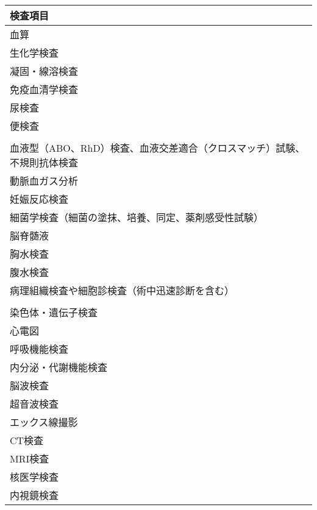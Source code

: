 \begin{xltabular}{\linewidth}{X}
\caption{\label{tbl:labo}} \\
\toprule
検査項目 \\
\midrule
\endhead
血算 \\
生化学検査 \\
凝固・線溶検査 \\
免疫血清学検査 \\
尿検査 \\
便検査 \\
 \\
血液型（ABO、RhD）検査、血液交差適合（クロスマッチ）試験、不規則抗体検査 \\
動脈血ガス分析 \\
妊娠反応検査 \\
細菌学検査（細菌の塗抹、培養、同定、薬剤感受性試験） \\
脳脊髄液 \\
胸水検査 \\
腹水検査 \\
病理組織検査や細胞診検査（術中迅速診断を含む） \\
 \\
染色体・遺伝子検査 \\
心電図 \\
呼吸機能検査 \\
内分泌・代謝機能検査 \\
脳波検査 \\
超音波検査 \\
エックス線撮影 \\
CT検査 \\
MRI検査 \\
核医学検査 \\
内視鏡検査 \\
\bottomrule
\end{xltabular}




